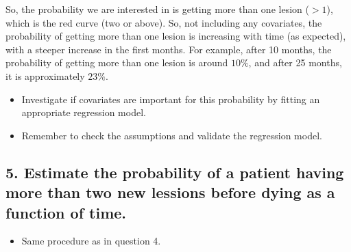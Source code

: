 \documentclass[
  11pt,
]{article}
\providecommand{\tightlist}{%
  \setlength{\itemsep}{0pt}\setlength{\parskip}{0pt}}
\begin{document}
So, the probability we are interested in is getting more than one lesion
(\(>1\)), which is the red curve (two or above). So, not including any
covariates, the probability of getting more than one lesion is
increasing with time (as expected), with a steeper increase in the first
months. For example, after 10 months, the probability of getting more
than one lesion is around \(10 \%\), and after 25 months, it is
approximately \(23 \%\).

\begin{itemize}
\item
  Investigate if covariates are important for this probability by
  fitting an appropriate regression model.
\item
  Remember to check the assumptions and validate the regression model.
\end{itemize}

\hypertarget{estimate-the-probability-of-a-patient-having-more-than-two-new-lessions-before-dying-as-a-function-of-time.}{%
\subsection{5. Estimate the probability of a patient having more than
two new lessions before dying as a function of
time.}\label{estimate-the-probability-of-a-patient-having-more-than-two-new-lessions-before-dying-as-a-function-of-time.}}

\begin{itemize}
\tightlist
\item
  Same procedure as in question 4.
\end{itemize}
\end{document}
